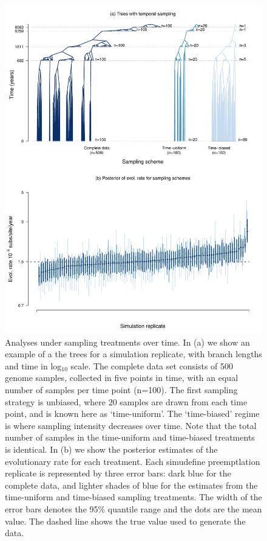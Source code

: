 \documentclass[11pt]{article}
\begin{document}
\begin{figure}[H]
	\begin{center}
		\includegraphics[scale=0.5, angle=0]{sampling_bias_summary_trees_rates.pdf}
		\caption{Analyses under sampling treatments over time. In (a) we show an example of a the trees for a simulation replicate, with branch lengths and time in log$_{10}$ scale. The complete data set consists of 500 genome samples, collected in five points in time, with an equal number of samples per time point (n=100). The first sampling strategy is unbiased, where 20 samples are drawn from each time point, and is known here as `time-uniform'. The `time-biased' regime is where sampling intensity decreases over time. Note that the total number of samples in the time-uniform and time-biased treatments is identical. In (b) we show the posterior estimates of the evolutionary rate for each treatment. Each simudefine preemptlation replicate is represented by three error bars: dark blue for the complete data, and lighter shades of blue for the estimates from the time-uniform and time-biased sampling treatments. The width of the error bars denotes the 95\% quantile range and the dots are the mean value. The dashed line shows the true value used to generate the data.}
		\label{figure:Fig4}
	\end{center}
\end{figure}
\end{document}
